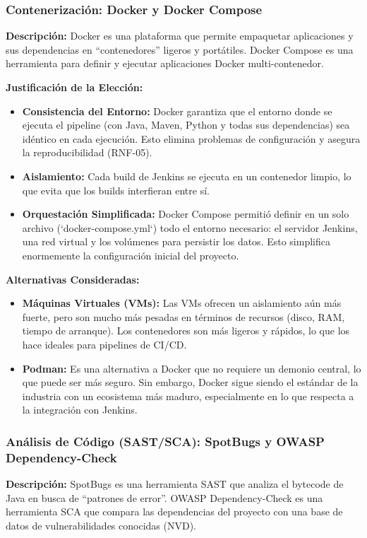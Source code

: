 \subsubsection{Contenerización: Docker y Docker Compose}
\textbf{Descripción:} Docker es una plataforma que permite empaquetar aplicaciones y sus dependencias en ``contenedores'' ligeros y portátiles. Docker Compose es una herramienta para definir y ejecutar aplicaciones Docker multi-contenedor.

\textbf{Justificación de la Elección:}
\begin{itemize}
    \item \textbf{Consistencia del Entorno:} Docker garantiza que el entorno donde se ejecuta el pipeline (con Java, Maven, Python y todas sus dependencias) sea idéntico en cada ejecución. Esto elimina problemas de configuración y asegura la reproducibilidad (RNF-05).
    \item \textbf{Aislamiento:} Cada build de Jenkins se ejecuta en un contenedor limpio, lo que evita que los builds interfieran entre sí.
    \item \textbf{Orquestación Simplificada:} Docker Compose permitió definir en un solo archivo (`docker-compose.yml`) todo el entorno necesario: el servidor Jenkins, una red virtual y los volúmenes para persistir los datos. Esto simplifica enormemente la configuración inicial del proyecto.
\end{itemize}
\textbf{Alternativas Consideradas:}
\begin{itemize}
    \item \textbf{Máquinas Virtuales (VMs):} Las VMs ofrecen un aislamiento aún más fuerte, pero son mucho más pesadas en términos de recursos (disco, RAM, tiempo de arranque). Los contenedores son más ligeros y rápidos, lo que los hace ideales para pipelines de CI/CD.
    \item \textbf{Podman:} Es una alternativa a Docker que no requiere un demonio central, lo que puede ser más seguro. Sin embargo, Docker sigue siendo el estándar de la industria con un ecosistema más maduro, especialmente en lo que respecta a la integración con Jenkins.
\end{itemize}

\subsubsection{Análisis de Código (SAST/SCA): SpotBugs y OWASP Dependency-Check}
\textbf{Descripción:} SpotBugs es una herramienta SAST que analiza el bytecode de Java en busca de ``patrones de error''. OWASP Dependency-Check es una herramienta SCA que compara las dependencias del proyecto con una base de datos de vulnerabilidades conocidas (NVD).

